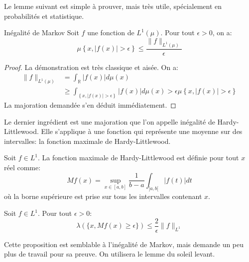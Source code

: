 Le lemme suivant est simple à prouver, mais très utile, spécialement en
probabilités et statistique.
\begin{lemme}{Inégalité de Markov}\label{lem:ineg_markov}
Soit $f$ une fonction de $L^1(\mu)$. Pour tout $\epsilon > 0$, on a:
\[
\mu \left \{ x , |f(x)| > \epsilon 
\right \} \leq \frac{\|f\|_{L^1(\mu)}}{\epsilon}
\] 
\end{lemme}
\begin{proof}
La démonstration est très classique et aisée.
On a:
\begin{align*}
\|f\|_{L^1(\mu)} &= \int_{\mathbb{R}}|f(x)| d\mu(x)  \\
& \geq \int_{\left \{ x , |f(x)| > \epsilon \right \}}|f(x)| d\mu(x) > \epsilon
\mu \left \{ x , |f(x)| > \epsilon \right \}  
\end{align*}
La majoration demandée s'en déduit immédiatement. 
\end{proof}
Le dernier ingrédient est une majoration que l'on appelle inégalité de
Hardy-Littlewood. Elle s'applique à une fonction qui représente une
moyenne sur des intervalles: la fonction maximale de Hardy-Littlewood.
\begin{defn}\label{def:hardy_littlewood}
Soit $f \in L^1$. La fonction maximale de Hardy-Littlewood est définie pour tout
$x$ réel comme:
\[
Mf(x) = \sup_{x \in [a,b]} \frac{1}{b-a} \int_{]a,b[} |f(t)| dt
\]
où la borne supérieure est prise sur tous les intervalles contenant $x$.
\end{defn}
\begin{prop}\label{prop:ineg_hardy_littlewood}
Soit $f \in L^1$. Pour tout $\epsilon > 0$:
\[
\lambda \left(\{ x, Mf(x) \geq \epsilon \}\right) \leq \frac{2}{\epsilon}
\|f\|_{L^1}
\]
\end{prop}
Cette proposition est semblable à l'inégalité de Markov, mais demande un peu
plus de travail pour sa preuve. On utilisera le lemme du soleil levant.
